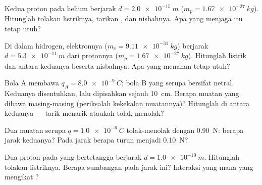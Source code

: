 \begin{exercise}[$\star\star$]\label{exo:g11:fundamental-interactions:6}
Kedua proton pada  helium berjarak $d = \qty{2.0e-15}{m}$
($m_p = \qty{1.67e-27}{kg}$). Hitunglah tolakan listriknya, tarikan
, dan nisbahnya. Apa yang menjaga  itu tetap utuh?
\end{exercise}

\begin{exercise}[$\star\star$]\label{exo:g11:fundamental-interactions:7}
Di dalam  hidrogen, elektronnya ($m_e = \qty{9.11e-31}{kg}$)
berjarak $d = \qty{5.3e-11}{m}$ dari protonnya
($m_p = \qty{1.67e-27}{kg}$). Hitunglah  listrik dan 
antara keduanya beserta nisbahnya. Apa yang menahan  tetap utuh?
\end{exercise}

\begin{exercise}[$\star\star$]\label{exo:g11:fundamental-interactions:8}
Bola A membawa $q_A = \qty{+8.0e-9}{C}$; bola B yang serupa bersifat
netral. Keduanya disentuhkan, lalu dipisahkan sejauh \qty{10}{cm}.
Berapa muatan yang dibawa masing-masing (periksalah kekekalan
muatannya)? Hitunglah  di antara keduanya --- tarik-menarik ataukah
tolak-menolak?
\end{exercise}

\begin{exercise}[$\star\star$]\label{exo:g11:fundamental-interactions:9}
Dua muatan serupa $q = \qty{1.0e-6}{C}$ tolak-menolak dengan
\qty{0.90}{N}: berapa jarak keduanya? Pada jarak berapa  turun
menjadi \qty{0.10}{N}?
\end{exercise}

\begin{exercise}[$\star\star$]\label{exo:g11:fundamental-interactions:10}
Dua proton pada  yang bertetangga berjarak
$d = \qty{1.0e-10}{m}$. Hitunglah tolakan listriknya. Berapa sumbangan
 pada jarak ini? Interaksi yang mana yang mengikat
?
\end{exercise}


